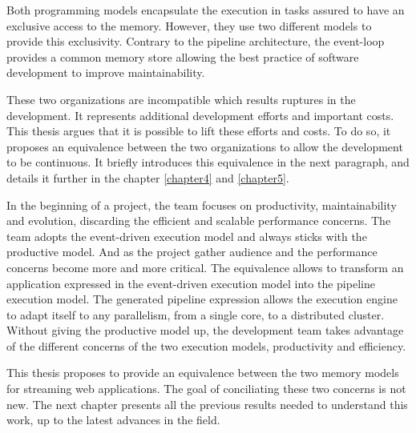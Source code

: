 Both programming models encapsulate the execution in tasks assured to have an exclusive access to the memory.
However, they use two different models to provide this exclusivity.
Contrary to the pipeline architecture, the event-loop provides a common memory store allowing the best practice of software development to improve maintainability.

These two organizations are incompatible which results ruptures in the development.
It represents additional development efforts and important costs.
This thesis argues that it is possible to lift these efforts and costs.
To do so, it proposes an equivalence between the two organizations to allow the development to be continuous.
It briefly introduces this equivalence in the next paragraph, and details it further in the chapter \ref{chapter4} and \ref{chapter5}.


In the beginning of a project, the team focuses on productivity, maintainability and evolution, discarding the efficient and scalable performance concerns.
The team adopts the event-driven execution model and always sticks with the productive model.
And as the project gather audience and the performance concerns become more and more critical.
The equivalence allows to transform an application expressed in the event-driven execution model into the pipeline execution model.
The generated pipeline expression allows the execution engine to adapt itself to any parallelism, from a single core, to a distributed cluster.
Without giving the productive model up, the development team takes advantage of the different concerns of the two execution models, productivity and efficiency.

\separator

This thesis proposes to provide an equivalence between the two memory models for streaming web applications.
The goal of conciliating these two concerns is not new.
The next chapter presents all the previous results needed to understand this work, up to the latest advances in the field.